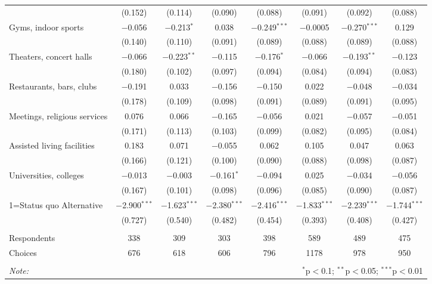 \begin{table}[!htbp]
\begin{tabular}{@{\extracolsep{5pt}}lccccccc}
  & (0.152) & (0.114) & (0.090) & (0.088) & (0.091) & (0.092) & (0.088) \\ 
  Gyms, indoor sports & $-$0.056 & $-$0.213$^{*}$ & 0.038 & $-$0.249$^{***}$ & $-$0.0005 & $-$0.270$^{***}$ & 0.129 \\ 
  & (0.140) & (0.110) & (0.091) & (0.089) & (0.088) & (0.089) & (0.088) \\ 
  Theaters, concert halls & $-$0.066 & $-$0.223$^{**}$ & $-$0.115 & $-$0.176$^{*}$ & $-$0.066 & $-$0.193$^{**}$ & $-$0.123 \\ 
  & (0.180) & (0.102) & (0.097) & (0.094) & (0.084) & (0.094) & (0.083) \\ 
  Restaurants, bars, clubs & $-$0.191 & 0.033 & $-$0.156 & $-$0.150 & 0.022 & $-$0.048 & $-$0.034 \\ 
  & (0.178) & (0.109) & (0.098) & (0.091) & (0.089) & (0.091) & (0.095) \\ 
  Meetings, religious services & 0.076 & 0.066 & $-$0.165 & $-$0.056 & 0.021 & $-$0.057 & $-$0.051 \\ 
  & (0.171) & (0.113) & (0.103) & (0.099) & (0.082) & (0.095) & (0.084) \\ 
  Assisted living facilities & 0.183 & 0.071 & $-$0.055 & 0.062 & 0.105 & 0.047 & 0.063 \\ 
  & (0.166) & (0.121) & (0.100) & (0.090) & (0.088) & (0.098) & (0.087) \\ 
  Universities, colleges & $-$0.013 & $-$0.003 & $-$0.161$^{*}$ & $-$0.094 & 0.025 & $-$0.034 & $-$0.056 \\ 
  & (0.167) & (0.101) & (0.098) & (0.096) & (0.085) & (0.090) & (0.087) \\ 
  1=Status quo Alternative & $-$2.900$^{***}$ & $-$1.623$^{***}$ & $-$2.380$^{***}$ & $-$2.416$^{***}$ & $-$1.833$^{***}$ & $-$2.239$^{***}$ & $-$1.744$^{***}$ \\ 
  & (0.727) & (0.540) & (0.482) & (0.454) & (0.393) & (0.408) & (0.427) \\ 
 \hline \\[-1.8ex] 
Respondents & 338 & 309 & 303 & 398 & 589 & 489 & 475\\ 
 Choices & 676 & 618 & 606 & 796 & 1178 & 978 & 950\\ 
\hline 
\hline \\[-1.8ex] 
\textit{Note:}  & \multicolumn{7}{r}{$^{*}$p$<$0.1; $^{**}$p$<$0.05; $^{***}$p$<$0.01} \\ 
\end{tabular} 
\end{table} 
